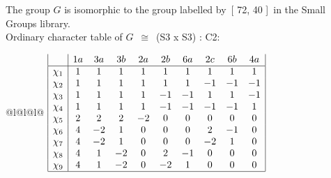 \documentclass[varwidth=\maxdimen,border=10]{standalone}
\begin{document}
The group $G$ is isomorphic to the group labelled by\ [ 72, 40 ]\ in the Small Groups library.\\
Ordinary character table of $G$\ $\cong$\ (S3 x S3) : C2:\\
\begin{center}
\begin{tabular}{@{}l@{}l@{}l@{}}
\hline
\(\begin{array}{|l|ccccccccc|}
  & 1a & 3a & 3b & 2a & 2b & 6a & 2c & 6b & 4a\\ \hline
\chi_{1} & 1 & 1 & 1 & 1 & 1 & 1 & 1 & 1 & 1\\
\chi_{2} & 1 & 1 & 1 & 1 & 1 & 1 & -1 & -1 & -1\\
\chi_{3} & 1 & 1 & 1 & 1 & -1 & -1 & 1 & 1 & -1\\
\chi_{4} & 1 & 1 & 1 & 1 & -1 & -1 & -1 & -1 & 1\\
\chi_{5} & 2 & 2 & 2 & -2 & 0 & 0 & 0 & 0 & 0\\
\chi_{6} & 4 & -2 & 1 & 0 & 0 & 0 & 2 & -1 & 0\\
\chi_{7} & 4 & -2 & 1 & 0 & 0 & 0 & -2 & 1 & 0\\
\chi_{8} & 4 & 1 & -2 & 0 & 2 & -1 & 0 & 0 & 0\\
\chi_{9} & 4 & 1 & -2 & 0 & -2 & 1 & 0 & 0 & 0\\
\hline
\end{array}\)\\
\end{tabular}
\end{center}
\end{document}
